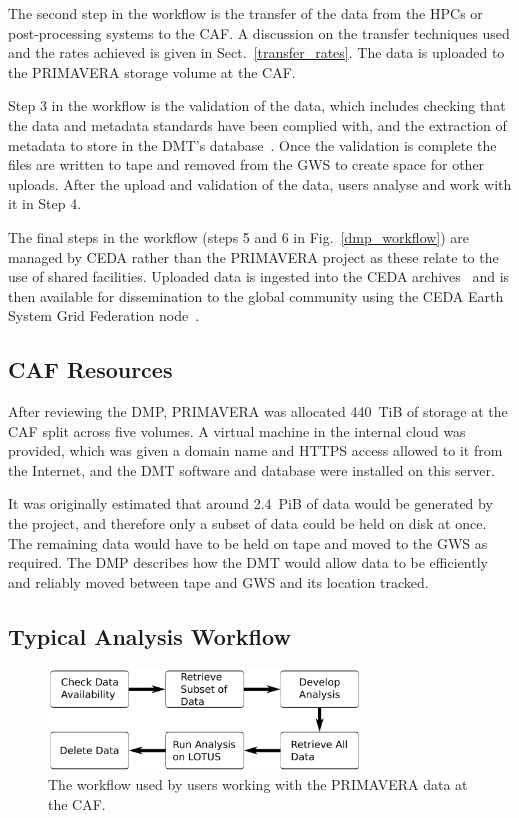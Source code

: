 \documentclass[gmd, manuscript]{copernicus}
\begin{document}
The second step in the workflow is the transfer of the data from the HPCs or post-processing systems to the CAF. A discussion on the transfer techniques used and the rates achieved is given in Sect.~\ref{transfer_rates}. The data is uploaded to the PRIMAVERA storage volume at the CAF.

Step 3 in the workflow is the validation of the data, which includes checking that the data and metadata standards have been complied with, and the extraction of metadata to store in the DMT's database~\citep{Seddon2020}. Once the validation is complete the files are written to tape and removed from the GWS to create space for other uploads. After the upload and validation of the data, users analyse and work with it in Step 4. 

The final steps in the workflow (steps 5 and 6 in Fig.~\ref{dmp_workflow}) are managed by CEDA rather than the PRIMAVERA project as these relate to the use of shared facilities. Uploaded data is ingested into the CEDA archives~\citep{CEDAArchive} and is then available for dissemination to the global community using the CEDA Earth System Grid Federation node~\citep{CEDAESGF}.


\subsection{CAF Resources}

After reviewing the DMP, PRIMAVERA was allocated 440~TiB of storage at the CAF split across five volumes. A virtual machine in the internal cloud was provided, which was given a domain name and HTTPS access allowed to it from the Internet, and the DMT software and database were installed on this server.

It was originally estimated that around 2.4~PiB of data would be generated by the project, and therefore only a subset of data could be held on disk at once. The remaining data would have to be held on tape and moved to the GWS as required. The DMP describes how the DMT would allow data to be efficiently and reliably moved between tape and GWS and its location tracked.

\subsection{Typical Analysis Workflow}

\begin{figure}[t]
	\includegraphics[width=8.3cm]{fig02.pdf}
	\caption{The workflow used by users working with the PRIMAVERA data at the CAF.}
	\label{analysis_workflow}
\end{figure}
\end{document}
